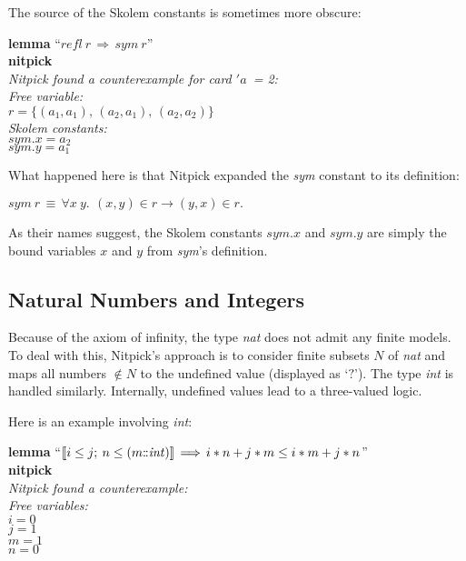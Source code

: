 \documentclass[a4paper,12pt]{article}
\def\Colon{\mathord{:\mkern-1.5mu:}}
\def\unk{{?}}
\begin{document}
The source of the Skolem constants is sometimes more obscure:

\prew
\textbf{lemma} ``$\mathit{refl}~r\,\Longrightarrow\, \mathit{sym}~r$'' \\
\textbf{nitpick} \\[2\smallskipamount]
\slshape
Nitpick found a counterexample for \textit{card} $'a$~= 2: \\[2\smallskipamount]
\hbox{}\qquad Free variable: \nopagebreak \\
\hbox{}\qquad\qquad $r = \{(a_1, a_1),\, (a_2, a_1),\, (a_2, a_2)\}$ \\
\hbox{}\qquad Skolem constants: \nopagebreak \\
\hbox{}\qquad\qquad $\mathit{sym}.x = a_2$ \\
\hbox{}\qquad\qquad $\mathit{sym}.y = a_1$
\postw

What happened here is that Nitpick expanded the \textit{sym} constant to its
definition:

\prew
$\mathit{sym}~r \,\equiv\,
 \forall x\> y.\,\> (x, y) \in r \longrightarrow (y, x) \in r.$
\postw

As their names suggest, the Skolem constants $\mathit{sym}.x$ and
$\mathit{sym}.y$ are simply the bound variables $x$ and $y$
from \textit{sym}'s definition.

\subsection{Natural Numbers and Integers}
\label{natural-numbers-and-integers}

Because of the axiom of infinity, the type \textit{nat} does not admit any
finite models. To deal with this, Nitpick's approach is to consider finite
subsets $N$ of \textit{nat} and maps all numbers $\notin N$ to the undefined
value (displayed as `$\unk$'). The type \textit{int} is handled similarly.
Internally, undefined values lead to a three-valued logic.

Here is an example involving \textit{int\/}:

\prew
\textbf{lemma} ``$\lbrakk i \le j;\> n \le (m{\Colon}\mathit{int})\rbrakk \,\Longrightarrow\, i * n + j * m \le i * m + j * n$'' \\
\textbf{nitpick} \\[2\smallskipamount]
\slshape Nitpick found a counterexample: \\[2\smallskipamount]
\hbox{}\qquad Free variables: \nopagebreak \\
\hbox{}\qquad\qquad $i = 0$ \\
\hbox{}\qquad\qquad $j = 1$ \\
\hbox{}\qquad\qquad $m = 1$ \\
\hbox{}\qquad\qquad $n = 0$
\postw
\end{document}
